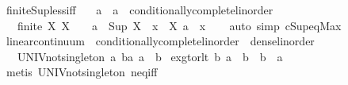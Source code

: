 \begin{isabellebody}
\endisatagproof
{\isafoldproof}%
%
\isadelimproof
\isanewline
%
\endisadelimproof
\isanewline
{}\isamarkupfalse%
\ finite{\isacharunderscore}{\kern0pt}Sup{\isacharunderscore}{\kern0pt}less{\isacharunderscore}{\kern0pt}iff{\isacharcolon}{\kern0pt}\isanewline
\ \ \ a\ {\isacharcolon}{\kern0pt}{\isacharcolon}{\kern0pt}\ {\isachardoublequoteopen}{\isacharprime}{\kern0pt}a\ {\isacharcolon}{\kern0pt}{\isacharcolon}{\kern0pt}\ conditionally{\isacharunderscore}{\kern0pt}complete{\isacharunderscore}{\kern0pt}linorder{\isachardoublequoteclose}\isanewline
\ \ \ {\isachardoublequoteopen}{\isasymlbrakk}finite\ X{\isacharsemicolon}{\kern0pt}\ X\ {\isasymnoteq}\ {\isacharbraceleft}{\kern0pt}{\isacharbraceright}{\kern0pt}{\isasymrbrakk}\ {\isasymLongrightarrow}\ a\ {\isachargreater}{\kern0pt}\ Sup\ X\ {\isasymlongleftrightarrow}\ {\isacharparenleft}{\kern0pt}{\isasymforall}x\ {\isasymin}\ X{\isachardot}{\kern0pt}\ a\ {\isachargreater}{\kern0pt}\ x{\isacharparenright}{\kern0pt}{\isachardoublequoteclose}\isanewline
%
\isadelimproof
\ \ %
\endisadelimproof
%
\isatagproof
{}\isamarkupfalse%
\ {\isacharparenleft}{\kern0pt}auto\ simp{\isacharcolon}{\kern0pt}\ cSup{\isacharunderscore}{\kern0pt}eq{\isacharunderscore}{\kern0pt}Max{\isacharparenright}{\kern0pt}%
\endisatagproof
{\isafoldproof}%
%
\isadelimproof
\isanewline
%
\endisadelimproof
\isanewline
{}\isamarkupfalse%
\ linear{\isacharunderscore}{\kern0pt}continuum\ {\isacharequal}{\kern0pt}\ conditionally{\isacharunderscore}{\kern0pt}complete{\isacharunderscore}{\kern0pt}linorder\ {\isacharplus}{\kern0pt}\ dense{\isacharunderscore}{\kern0pt}linorder\ {\isacharplus}{\kern0pt}\isanewline
\ \ \ UNIV{\isacharunderscore}{\kern0pt}not{\isacharunderscore}{\kern0pt}singleton{\isacharcolon}{\kern0pt}\ {\isachardoublequoteopen}{\isasymexists}a\ b{\isacharcolon}{\kern0pt}{\isacharcolon}{\kern0pt}{\isacharprime}{\kern0pt}a{\isachardot}{\kern0pt}\ a\ {\isasymnoteq}\ b{\isachardoublequoteclose}\isanewline
{}\isanewline
\isanewline
{}\isamarkupfalse%
\ ex{\isacharunderscore}{\kern0pt}gt{\isacharunderscore}{\kern0pt}or{\isacharunderscore}{\kern0pt}lt{\isacharcolon}{\kern0pt}\ {\isachardoublequoteopen}{\isasymexists}b{\isachardot}{\kern0pt}\ a\ {\isacharless}{\kern0pt}\ b\ {\isasymor}\ b\ {\isacharless}{\kern0pt}\ a{\isachardoublequoteclose}\isanewline
%
\isadelimproof
\ \ %
\endisadelimproof
%
\isatagproof
{}\isamarkupfalse%
\ {\isacharparenleft}{\kern0pt}metis\ UNIV{\isacharunderscore}{\kern0pt}not{\isacharunderscore}{\kern0pt}singleton\ neq{\isacharunderscore}{\kern0pt}iff{\isacharparenright}{\kern0pt}%

\end{isabellebody}
